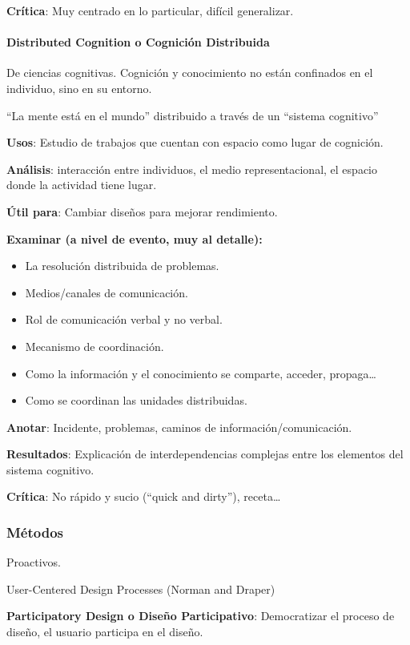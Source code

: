 \documentclass[12pt, twoside, openright]{report} %
\begin{document}
\textbf{Crítica}: Muy centrado en lo particular, difícil generalizar.

\paragraph{Distributed Cognition o Cognición
	Distribuida}

De ciencias cognitivas. Cognición y conocimiento no están confinados en
el individuo, sino en su entorno.

``La mente está en el mundo'' distribuido a través de un ``sistema
cognitivo''

\textbf{Usos}: Estudio de trabajos que cuentan con espacio como lugar de
cognición.

\textbf{Análisis}: interacción entre individuos, el medio
representacional, el espacio donde la actividad tiene lugar.

\textbf{Útil para}: Cambiar diseños para mejorar rendimiento.

\textbf{Examinar (a nivel de evento, muy al detalle):}

\begin{itemize}
	\item La resolución distribuida de problemas.
	\item Medios/canales de comunicación.
	\item Rol de comunicación verbal y no verbal.
	\item Mecanismo de coordinación.
	\item Como la información y el conocimiento se comparte, acceder, propaga\ldots{}
	\item Como se coordinan las unidades distribuidas.
\end{itemize}


\textbf{Anotar}: Incidente, problemas, caminos de
información/comunicación.

\textbf{Resultados}: Explicación de interdependencias complejas entre
los elementos del sistema cognitivo.

\textbf{Crítica}: No rápido y sucio (``quick and dirty''),
receta\ldots{}

\subsubsection{Métodos}

Proactivos.

User-Centered Design Processes (Norman and Draper)

\textbf{Participatory Design o Diseño Participativo}: Democratizar el
proceso de diseño, el usuario participa en el diseño.
\end{document}
